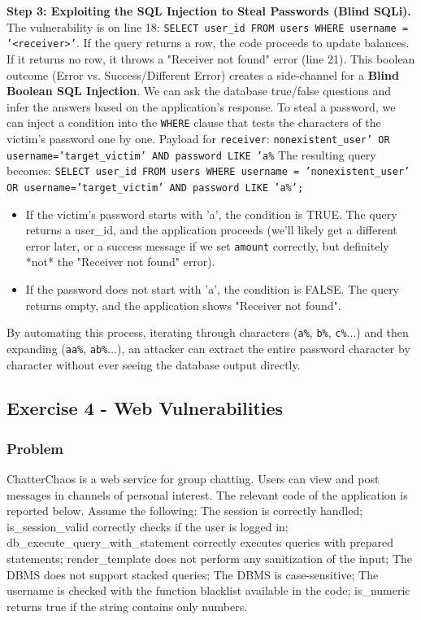 \documentclass{article}
\begin{document}
\textbf{Step 3: Exploiting the SQL Injection to Steal Passwords (Blind SQLi).}
The vulnerability is on line 18: \texttt{SELECT user\_id FROM users WHERE username = '<receiver>'}.
If the query returns a row, the code proceeds to update balances. If it returns no row, it throws a "Receiver not found" error (line 21).
This boolean outcome (Error vs. Success/Different Error) creates a side-channel for a \textbf{Blind Boolean SQL Injection}. We can ask the database true/false questions and infer the answers based on the application's response.
To steal a password, we can inject a condition into the \texttt{WHERE} clause that tests the characters of the victim's password one by one.
Payload for \texttt{receiver}: \texttt{nonexistent\_user' OR username='target\_victim' AND password LIKE 'a\%}
The resulting query becomes:
\texttt{SELECT user\_id FROM users WHERE username = 'nonexistent\_user' OR username='target\_victim' AND password LIKE 'a\%';}
\begin{itemize}
    \item If the victim's password starts with 'a', the condition is TRUE. The query returns a user\_id, and the application proceeds (we'll likely get a different error later, or a success message if we set \texttt{amount} correctly, but definitely *not* the "Receiver not found" error).
    \item If the password does not start with 'a', the condition is FALSE. The query returns empty, and the application shows "Receiver not found".
\end{itemize}
By automating this process, iterating through characters (\texttt{a\%}, \texttt{b\%}, \texttt{c\%}...) and then expanding (\texttt{aa\%}, \texttt{ab\%}...), an attacker can extract the entire password character by character without ever seeing the database output directly.

\subsection{Exercise 4 - Web Vulnerabilities}
\subsubsection*{Problem}
ChatterChaos is a web service for group chatting. Users can view and post messages in channels of personal interest. The relevant code of the application is reported below.
Assume the following: The session is correctly handled; is\_session\_valid correctly checks if the user is logged in; db\_execute\_query\_with\_statement correctly executes queries with prepared statements; render\_template does not perform any sanitization of the input; The DBMS does not support stacked queries; The DBMS is case-sensitive; The username is checked with the function blacklist available in the code; is\_numeric returns true if the string contains only numbers.
\end{document}
